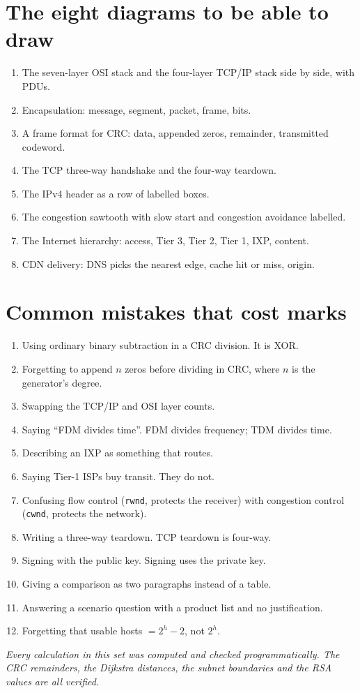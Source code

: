 \documentclass[11pt,a4paper]{article}
\begin{document}
\section{The eight diagrams to be able to draw}

\begin{enumerate}
\item The seven-layer OSI stack and the four-layer TCP/IP stack side by side, with PDUs.
\item Encapsulation: message, segment, packet, frame, bits.
\item A frame format for CRC: data, appended zeros, remainder, transmitted codeword.
\item The TCP three-way handshake and the four-way teardown.
\item The IPv4 header as a row of labelled boxes.
\item The congestion sawtooth with slow start and congestion avoidance labelled.
\item The Internet hierarchy: access, Tier 3, Tier 2, Tier 1, IXP, content.
\item CDN delivery: DNS picks the nearest edge, cache hit or miss, origin.
\end{enumerate}

\section{Common mistakes that cost marks}

\begin{enumerate}
\item Using ordinary binary subtraction in a CRC division. It is XOR.
\item Forgetting to append $n$ zeros before dividing in CRC, where $n$ is the generator's degree.
\item Swapping the TCP/IP and OSI layer counts.
\item Saying ``FDM divides time''. FDM divides frequency; TDM divides time.
\item Describing an IXP as something that routes.
\item Saying Tier-1 ISPs buy transit. They do not.
\item Confusing flow control (\texttt{rwnd}, protects the receiver) with congestion control (\texttt{cwnd}, protects the network).
\item Writing a three-way teardown. TCP teardown is four-way.
\item Signing with the public key. Signing uses the private key.
\item Giving a comparison as two paragraphs instead of a table.
\item Answering a scenario question with a product list and no justification.
\item Forgetting that usable hosts $= 2^h - 2$, not $2^h$.
\end{enumerate}

\vfill
\begin{center}\textit{Every calculation in this set was computed and checked programmatically. The CRC remainders, the Dijkstra distances, the subnet boundaries and the RSA values are all verified.}\end{center}
\end{document}
